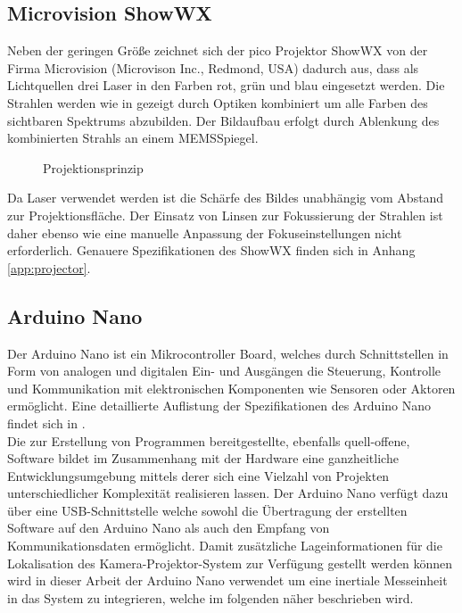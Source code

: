 \subsection{Microvision ShowWX}%
\label{chap.projector}
Neben der geringen Größe zeichnet sich der pico Projektor ShowWX von der Firma Microvision (Microvison Inc., Redmond, USA) dadurch aus, dass als Lichtquellen drei Laser in den Farben rot, grün und blau eingesetzt werden. Die Strahlen werden wie in  gezeigt durch Optiken kombiniert um alle Farben des sichtbaren Spektrums abzubilden. Der Bildaufbau erfolgt durch Ablenkung des kombinierten Strahls an einem MEMS\red[\footnote{MEMS = mikro-elektromechanisches System / Mikrospiegelaktor(?)}] Spiegel.

\begin{figure}[ht]
	\begin{center}
		\caption{Projektionsprinzip}
		\label{fig.projtech}
	\end{center}
\end{figure}

Da Laser verwendet werden ist die Schärfe des Bildes unabhängig vom Abstand zur Projektionsfläche. Der Einsatz von Linsen zur Fokussierung der Strahlen ist daher ebenso wie eine manuelle Anpassung der Fokuseinstellungen nicht erforderlich.  Genauere Spezifikationen des ShowWX finden sich in Anhang \ref{app:projector}.


\subsection{Arduino Nano}
\label{chap.arduino}
Der Arduino Nano ist ein  Mikrocontroller Board, welches durch Schnittstellen in Form von analogen und digitalen Ein- und Ausgängen die Steuerung, Kontrolle und Kommunikation mit elektronischen Komponenten wie Sensoren oder Aktoren ermöglicht. Eine detaillierte Auflistung der Spezifikationen des Arduino Nano findet sich in .\\
Die zur Erstellung von Programmen bereitgestellte, ebenfalls quell-offene, Software bildet im Zusammenhang mit der Hardware eine ganzheitliche Entwicklungsumgebung mittels derer sich eine Vielzahl von Projekten unterschiedlicher Komplexität realisieren lassen. Der Arduino Nano verfügt dazu über eine USB-Schnittstelle welche sowohl die Übertragung der erstellten Software auf den Arduino Nano als auch den Empfang von Kommunikationsdaten ermöglicht. Damit zusätzliche Lageinformationen für die Lokalisation des Kamera-Projektor-System zur Verfügung gestellt werden können wird in dieser Arbeit der Arduino Nano verwendet um eine inertiale Messeinheit in das System zu integrieren, welche im folgenden näher beschrieben wird.
\\

